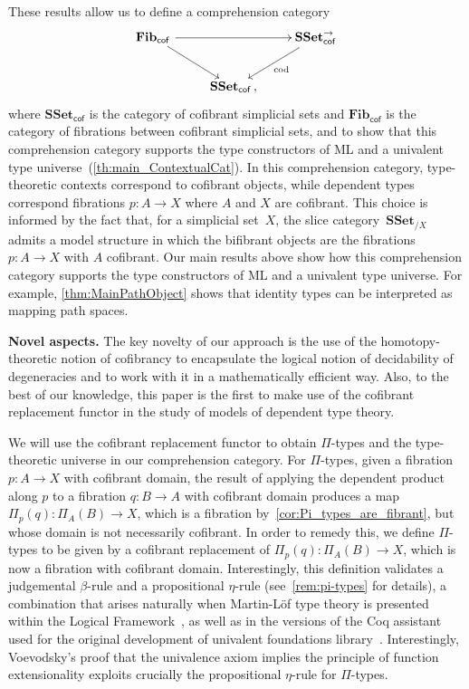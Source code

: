 \documentclass[reqno,10pt,a4paper,oneside]{amsart}
\numberwithin{equation}{section}
\theoremstyle{mythm}
\theoremstyle{mydef}
\theoremstyle{myrmk}
\newcommand{\co}{\colon}
\newcommand{\SSet}{\mathbf{SSet}}
\begin{document}
These results allow us to define a comprehension category 
\begin{equation*}
\begin{gathered}
\xymatrix{
\mathbf{Fib}_{ \mathsf{cof}} \, \ar[dr] \ar[rr] & & \SSet^{\to}_{\mathsf{cof}} \ar[dl]^{\mathrm{cod}} \\ 
 & \SSet_{\mathsf{cof}} \, , &  }
 \end{gathered}
 \end{equation*}
 where $\SSet_{\mathsf{cof}}$ is the category of cofibrant simplicial sets and  $\mathbf{Fib}_{ \mathsf{cof}}$ is the category of fibrations between cofibrant simplicial
 sets, and to show that this comprehension category supports the type constructors of ML and a univalent type universe~(\cref{th:main_ContextualCat}). In this 
comprehension category, type-theoretic
contexts correspond to cofibrant objects, while dependent types correspond fibrations $p \co A \to X$ where 
 $A$ and $X$ are cofibrant. This choice is informed by the fact that, for a simplicial set~$X$, the slice category~$\mathbf{SSet}_{/X}$ admits a model structure in which the bifibrant objects are
 the fibrations $p \co A \to X$ with $A$ cofibrant. Our main results above show how this comprehension category  supports the type constructors of ML and a univalent type universe.
For example, \cref{thm:MainPathObject} shows that identity types can be interpreted as 
mapping path spaces. 

\smallskip

\noindent
\textbf{Novel aspects.} The key novelty of our approach is the use of the homotopy-theoretic notion of cofibrancy to encapsulate the logical notion of decidability of degeneracies and to work with it in a 
mathematically efficient way. Also, to the best of our knowledge, this paper is the first to make use of the cofibrant replacement functor in the study of models of dependent type theory.

We will use the cofibrant  replacement functor
to obtain $\Pi$-types and the type-theoretic universe in our comprehension category.  For $\Pi$-types, given a fibration $p \co A \to X$ with cofibrant domain, the result of applying the dependent product along $p$ to a fibration $q \co B \to A$ with cofibrant domain produces a map  $\Pi_p(q) \co \Pi_A(B) \to X$, which is a fibration by~\cref{cor:Pi_types_are_fibrant}, but whose domain
is not necessarily cofibrant. In order to remedy this, we define  $\Pi$-types to be given by a cofibrant replacement of
$\Pi_p(q) \co \Pi_A(B) \to X$, which is now a fibration with cofibrant domain. 
Interestingly, this definition validates
a judgemental $\beta$-rule and a propositional $\eta$-rule (see~\cref{rem:pi-types} for details), a combination that arises naturally when  Martin-L\"of type theory is presented
within the Logical Framework~\cite{nordstrom-petersson-smith:ml,GarnerR:strdp}, as well as in
the versions of the Coq assistant used for the original development of  univalent foundations
library~\cite{voevodsky:library}. Interestingly, Voevodsky's proof that the univalence axiom implies the principle of function extensionality exploits crucially the propositional $\eta$-rule for $\Pi$-types. 
\end{document}
